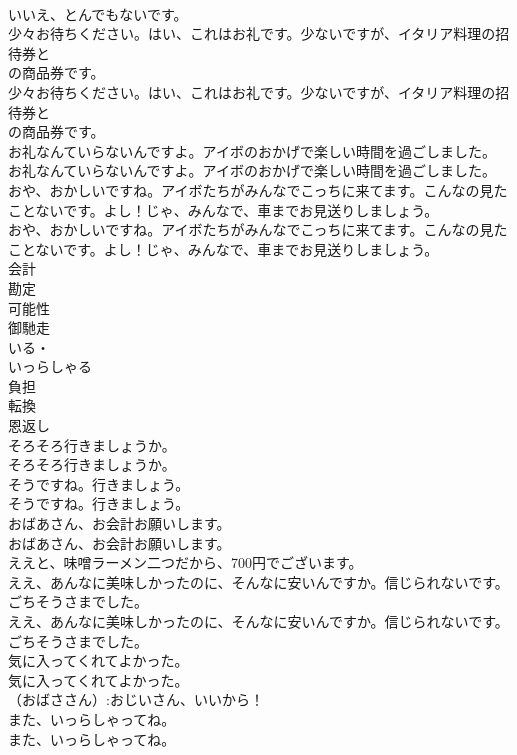 \documentclass[8pt]{extreport}
\begin{document}
\begin{CJK}{UTF8}{min}
\\	いいえ、とんでもないです。 
\\	少々お待ちください。はい、これはお礼です。少ないですが、イタリア料理の招待券と
\\	の商品券です。	
\\	少々お待ちください。はい、これはお礼です。少ないですが、イタリア料理の招待券と
\\	の商品券です。 
\\	お礼なんていらないんですよ。アイボのおかげで楽しい時間を過ごしました。	
\\	お礼なんていらないんですよ。アイボのおかげで楽しい時間を過ごしました。 
\\	おや、おかしいですね。アイボたちがみんなでこっちに来てます。こんなの見たことないです。よし！じゃ、みんなで、車までお見送りしましょう。	
\\	おや、おかしいですね。アイボたちがみんなでこっちに来てます。こんなの見たことないです。よし！じゃ、みんなで、車までお見送りしましょう。 
\\	会計
\\	勘定
\\	可能性
\\	御馳走
\\	いる・
\\	いっらしゃる
\\	負担
\\	転換
\\	恩返し
\\	そろそろ行きましょうか。	
\\	そろそろ行きましょうか。 
\\	そうですね。行きましょう。	
\\	そうですね。行きましょう。 
\\	おばあさん、お会計お願いします。	
\\	おばあさん、お会計お願いします。 
\\	ええと、味噌ラーメン二つだから、700円でございます。	
\\	ええ、あんなに美味しかったのに、そんなに安いんですか。信じられないです。ごちそうさまでした。	
\\	ええ、あんなに美味しかったのに、そんなに安いんですか。信じられないです。ごちそうさまでした。 
\\	気に入ってくれてよかった。	
\\	気に入ってくれてよかった。 
\\	（おばささん）:おじいさん、いいから！	
\\	また、いっらしゃってね。	
\\	また、いっらしゃってね。 

\end{CJK}
\end{document}
